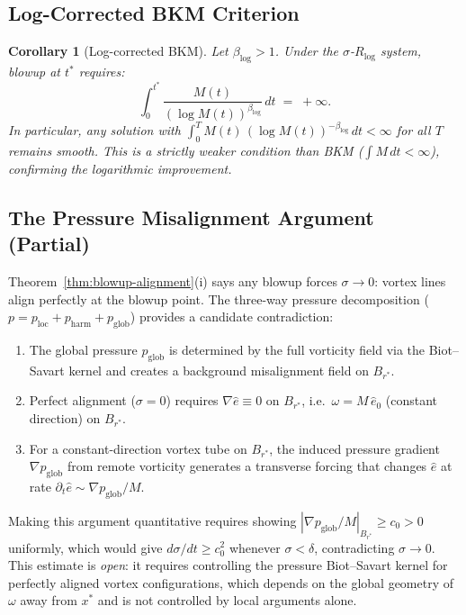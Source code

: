 \documentclass[11pt]{article}
\newtheorem{corollary}[theorem]{Corollary}
\theoremstyle{definition}
\theoremstyle{remark}
\begin{document}
\subsection{Log-Corrected BKM Criterion}

\begin{corollary}[Log-corrected BKM]\label{cor:log-BKM}
  Let $\beta_{\log}>1$.  Under the $\sigma$-$R_{\log}$ system, blowup at $t^*$ requires:
  \[
    \int_0^{t^*} \frac{M(t)}{(\log M(t))^{\beta_{\log}}}\,dt \;=\; +\infty.
  \]
  In particular, any solution with
  $\int_0^T M(t)\,(\log M(t))^{-\beta_{\log}}\,dt < \infty$ for all $T$
  remains smooth.  This is a strictly weaker condition than BKM ($\int M\,dt<\infty$),
  confirming the logarithmic improvement.
\end{corollary}

\subsection{The Pressure Misalignment Argument (Partial)}

Theorem~\ref{thm:blowup-alignment}(i) says any blowup forces $\sigma\to 0$:
vortex lines align perfectly at the blowup point.  The three-way pressure
decomposition ($p = p_{\mathrm{loc}} + p_{\mathrm{harm}} + p_{\mathrm{glob}}$)
provides a candidate contradiction:

\begin{enumerate}
  \item The global pressure $p_{\mathrm{glob}}$ is determined by the full vorticity
    field via the Biot--Savart kernel and creates a background misalignment field
    on $B_{r^*}$.
  \item Perfect alignment ($\sigma = 0$) requires $\nabla\hat{e}\equiv 0$ on
    $B_{r^*}$, i.e.\ $\omega = M\,\hat{e}_0$ (constant direction) on $B_{r^*}$.
  \item For a constant-direction vortex tube on $B_{r^*}$, the induced pressure
    gradient $\nabla p_{\mathrm{glob}}$ from remote vorticity generates a transverse
    forcing that changes $\hat{e}$ at rate $\partial_t\hat{e}\sim\nabla p_{\mathrm{glob}}/M$.
\end{enumerate}

Making this argument quantitative requires showing
$|\nabla p_{\mathrm{glob}}/M|_{B_{r^*}} \geq c_0 > 0$ uniformly, which would give
$d\sigma/dt\geq c_0^2$ whenever $\sigma < \delta$, contradicting $\sigma\to 0$.
This estimate is \emph{open}: it requires controlling the pressure Biot--Savart kernel
for perfectly aligned vortex configurations, which depends on the global geometry
of $\omega$ away from $x^*$ and is not controlled by local arguments alone.
\end{document}
